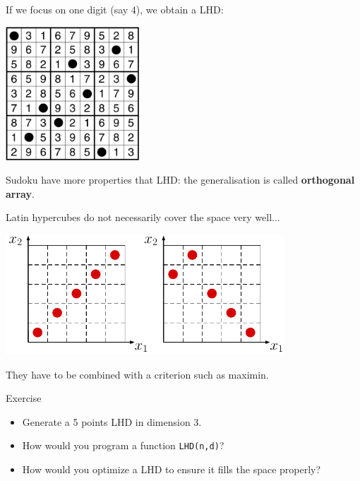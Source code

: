 \documentclass{beamer}
\begin{document}
\begin{frame}{}
If we focus on one digit (say $4$), we obtain a LHD:
\vspace{2mm}
\begin{center}
\includegraphics[height=5cm]{figures/latexdraw/sudoku}
\end{center}
Sudoku have more properties that LHD: the generalisation is called \textbf{orthogonal array}.
\end{frame}

\begin{frame}{}
Latin hypercubes do not necessarily cover the space very well...
\begin{center}
\includegraphics[height=4.5cm]{figures/latexdraw/lhs2}
\end{center}
They have to be combined with a criterion such as maximin.
\end{frame}

\begin{frame}{}
\begin{exampleblock}{Exercise}
\begin{itemize}
	\item Generate a 5 points LHD in dimension 3.
	\item How would you program a function \texttt{LHD(n,d)}? 
	\item How would you optimize a LHD to ensure it fills the space properly?
\end{itemize}
\end{exampleblock}
\end{frame}
\end{document}
